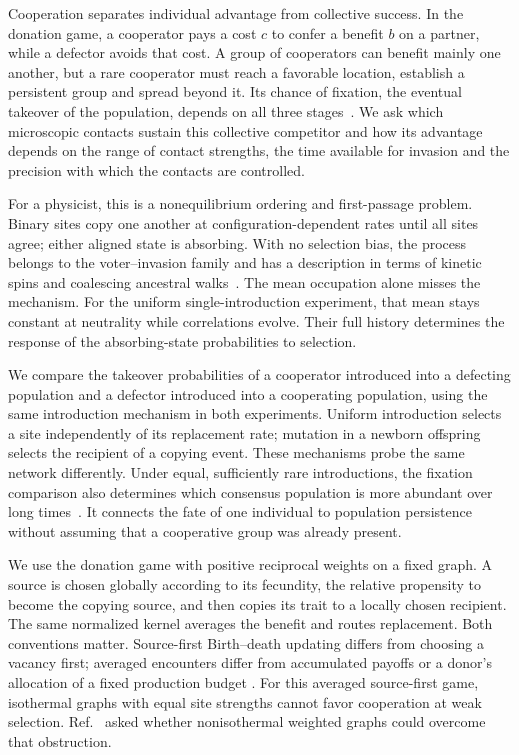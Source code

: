 \documentclass[aps,pre,reprint,amsmath,amssymb,longbibliography]{revtex4-2}
\begin{document}
Cooperation separates individual advantage from collective success.
In the donation game, a cooperator pays a cost $c$ to confer a benefit
$b$ on a partner, while a defector avoids that cost. A group of
cooperators can benefit mainly one another, but a rare cooperator must
reach a favorable location, establish a persistent group and spread
beyond it. Its chance of fixation, the eventual takeover of the
population, depends on all three stages~\cite{AllenNowak2014,McAvoyRaoHauert2021}. We ask which
microscopic contacts sustain this collective competitor and how its
advantage depends on the range of contact strengths, the time available
for invasion and the precision with which the contacts are controlled.

For a physicist, this is a nonequilibrium ordering and first-passage
problem. Binary sites copy one another at configuration-dependent
rates until all sites agree; either aligned state is absorbing.
With no selection bias, the process belongs to the voter--invasion
family and has a description in terms of kinetic spins and coalescing
ancestral walks~\cite{SoodAntalRedner2008,BaronchelliCastellanoPastorSatorras2011,Schutz2001}.
The mean occupation alone misses the mechanism. For the uniform
single-introduction experiment, that mean stays constant at neutrality
while correlations evolve. Their full history determines the response
of the absorbing-state probabilities to selection. 

We compare the takeover probabilities of a cooperator introduced into
a defecting population and a defector introduced into a cooperating
population, using the same introduction mechanism in both experiments.
Uniform introduction selects a site independently of its replacement
rate; mutation in a newborn offspring selects the recipient of a copying
event. These mechanisms probe the same network differently. Under equal,
sufficiently rare introductions, the fixation comparison also determines
which consensus population is more abundant over long
times~\cite{McAvoyAllen2021}. It connects the fate of one individual
to population persistence without assuming that a cooperative group
was already present.

We use the donation game with positive reciprocal weights on a fixed
graph. A source is chosen globally according to its fecundity, the relative
propensity to become the copying source, 
  and then
copies its trait to a locally chosen recipient. The same normalized
kernel averages the benefit and routes replacement. Both conventions
matter. Source-first Birth--death updating differs from choosing a
vacancy first; averaged encounters differ from accumulated payoffs or
a donor's allocation of a fixed production budget
\cite{OhtsukiEtAl2006,McAvoyAllenNowak2020,McAvoyRaoHauert2021}.
For this averaged source-first game, isothermal graphs with equal site
strengths cannot favor cooperation at weak selection.
Ref.~\cite[Discussion]{AllenLippnerNowak2019} asked whether nonisothermal weighted
graphs could overcome that obstruction.
\end{document}
